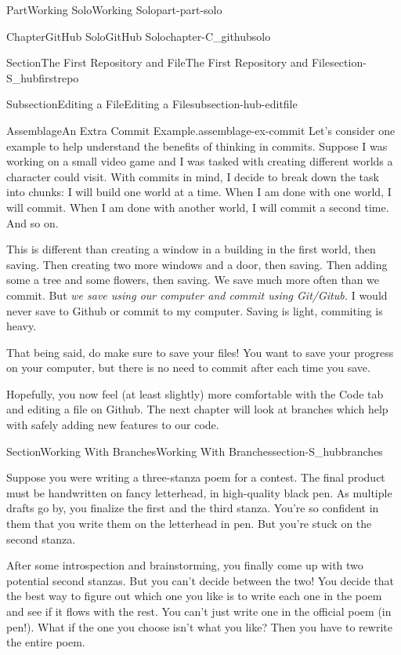 \documentclass[twoside,10pt,]{book}
\begin{document}
\begin{partptx}{Part}{Working Solo}{}{Working Solo}{}{}{part-part-solo}
\begin{chapterptx}{Chapter}{GitHub Solo}{}{GitHub Solo}{}{}{chapter-C_githubsolo}
\begin{sectionptx}{Section}{The First Repository and File}{}{The First Repository and File}{}{}{section-S_hubfirstrepo}
\begin{subsectionptx}{Subsection}{Editing a File}{}{Editing a File}{}{}{subsection-hub-editfile}
\begin{assemblage}{Assemblage}{An Extra Commit Example.}{assemblage-ex-commit}
Let's consider one example to help understand the benefits of thinking in commits. Suppose I was working on a small video game and I was tasked with creating different worlds a character could visit. With commits in mind, I decide to break down the task into chunks: I will build one world at a time. When I am done with one world, I will commit. When I am done with another world, I will commit a second time. And so on.%
\par
This is different than creating a window in a building in the first world, then saving. Then creating two more windows and a door, then saving. Then adding some a tree and some flowers, then saving. We save much more often than we commit. But \emph{we save using our computer and commit using Git\slash{}Gitub.} I would never save to Github or commit to my computer. Saving is light, commiting is heavy.%
\par
That being said, do make sure to save your files! You want to save your progress on your computer, but there is no need to commit after each time you save.%
\end{assemblage}
\end{subsectionptx}
\begin{conclusion}{}%
Hopefully, you now feel (at least slightly) more comfortable with the Code tab and editing a file on Github. The next chapter will look at branches which help with safely adding new features to our code.%
\end{conclusion}%
\end{sectionptx}
%
%
\typeout{************************************************}
\typeout{************************************************}
%
\begin{sectionptx}{Section}{Working With Branches}{}{Working With Branches}{}{}{section-S_hubbranches}
%
%
\begin{introduction}{}%
Suppose you were writing a three-stanza poem for a contest. The final product must be handwritten on fancy letterhead, in high-quality black pen. As multiple drafts go by, you finalize the first and the third stanza. You're so confident in them that you write them on the letterhead in pen. But you're stuck on the second stanza.%
\par
After some introspection and brainstorming, you finally come up with two potential second stanzas. But you can't decide between the two! You decide that the best way to figure out which one you like is to write each one in the poem and see if it flows with the rest. You can't just write one in the official poem (in pen!). What if the one you choose isn't what you like? Then you have to rewrite the entire poem.%

\end{introduction}
\end{sectionptx}
\end{chapterptx}
\end{partptx}
\end{document}
